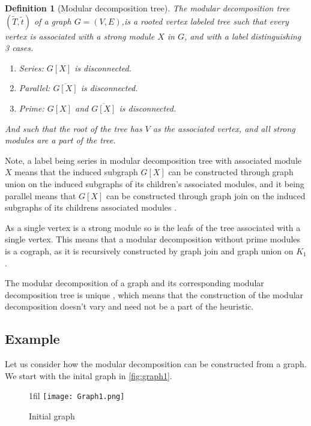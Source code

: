 \documentclass[a4paper]{article}
\makeatletter
\newtheorem{definition}{Definition}[section]
\newcommand{\T}{\widetilde{T}}
\renewcommand{\t}{\widetilde{t}}
\newcommand*{\centerfloat}{%
  \parindent \z@
  \leftskip \z@ \@plus 1fil \@minus \textwidth
  \rightskip\leftskip
  \parfillskip \z@skip}
\makeatother
\begin{document}
\begin{definition}[Modular decomposition tree]{\cite{HCL}}
    The modular decomposition tree $(\T,\t)$ of a graph $G = (V,E)$,is a rooted
    vertex labeled tree such that every vertex is associated with a strong
    module $X$ in $G$, and with a label distinguishing 3 cases.
    \begin{enumerate}
        \item Series: $G[X]$ is disconnected.
        \item Parallel: $\overline{G[X]}$ is disconnected.
        \item Prime: $G[X]$ and $\overline{G[X]}$ is disconnected.
    \end{enumerate}
    And such that the root of the tree has $V$ as the associated vertex, and all 
    strong modules are a part of the tree.
\end{definition}

Note, a label being series in modular decomposition tree with associated module
$X$ means that the induced subgraph $G[X]$ can be constructed through graph
union on the induced subgraphs of its children's associated modules, and it being
parallel means that $G[X]$ can be constructed through graph join on the
induced subgraphs of its childrens associated modules \cite{HCL}.

As a single vertex is a strong module so is the leafs of the tree associated
with a single vertex. This means that a modular decomposition without
prime modules is a cograph, as it is recursively constructed by graph join and
graph union on $K_1$.

The modular decomposition of a graph and its corresponding modular
decomposition tree is unique \cite{MDUnique}, which means that the construction
of the modular decomposition doesn't vary and need not be a part of
the heuristic.


\subsection{Example}

Let us consider how the modular decomposition can be constructed from a graph. 
We start with the inital graph in \autoref{fig:graph1}.

\begin{figure}[H]
    \centerfloat
    \texttt{[image: Graph1.png]}
    \caption{Initial graph}
    \label{fig:graph1}
\end{figure}
\end{document}
